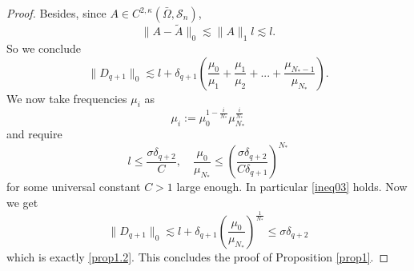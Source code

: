 \documentclass[10pt,a4paper]{amsart}
\renewcommand{\S}{{\mathcal{S}_n}}
\begin{document}
\begin{proof}
Besides, since $A\in C^{2,\kappa}(\bar\Omega,\S)$,
\begin{equation*}
    \|A-\tilde A\|_0\lesssim \|A\|_1 l\lesssim l.
\end{equation*}
So we conclude
\begin{equation*}
    \|D_{q+1}\|_0\lesssim l+\delta_{q+1}(\frac{\mu_0}{\mu_1}
    +\frac{\mu_1}{\mu_2}+...+\frac{\mu_{N_*-1}}{\mu_{N_*}}).
\end{equation*}
We now take frequencies $\mu_i$ as
\begin{equation*}
    \mu_i:=\mu_0^{1-\frac{i}{N_*}}\mu_{N_*}^\frac{i}{N_*}
\end{equation*}
and require
\begin{equation}\label{ineq**}
    l\le \frac{\sigma\delta_{q+2}}{C},\quad 
    \frac{\mu_0}{\mu_{N_*}}\le
    (\frac{\sigma\delta_{q+2}}{C\delta_{q+1}})^{N_*}
\end{equation}
for some universal constant $C>1$ large enough. 
In particular \eqref{ineq03} holds.
Now we get
\begin{equation*}
\|D_{q+1}\|_0\lesssim l+\delta_{q+1}(\frac{\mu_0}{\mu_{N_*}})^\frac{1}{N_*}\le{\sigma}\delta_{q+2}
\end{equation*}
which is exactly \eqref{prop1.2}. This concludes the proof of Proposition \ref{prop1}.
\end{proof}
\end{document}
